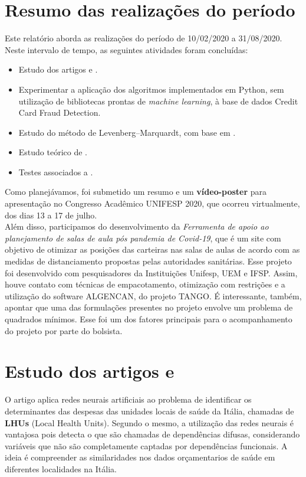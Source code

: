 \documentclass[11pt]{article}
\begin{document}
\section*{Resumo das realizações do período}
Este relatório aborda as realizações do período de 10/02/2020 a 31/08/2020. Neste intervalo de tempo, as seguintes atividades foram concluídas:

\begin{itemize}
\item Estudo dos artigos \cite{fraudeItalia1} e \cite{fraudeItalia2}.
\item Experimentar a aplicação dos algoritmos implementados em Python, sem utilização de bibliotecas prontas de \textit{machine learning}, à base de dados Credit Card Fraud Detection.

\item Estudo do método de Levenberg–Marquardt, com base em \cite{TCCKleber}.
\item Estudo teórico de \cite{bmLS}. 
\item Testes associados a \cite{bmLS}.
\end{itemize}

\noindent
Como planejávamos, foi submetido um resumo e um \textbf{vídeo-poster} para apresentação no Congresso Acadêmico UNIFESP 2020, que ocorreu virtualmente, dos dias 13 a 17 de julho.\\

\noindent
Além disso, participamos do desenvolvimento da \textit{Ferramenta de apoio ao planejamento de salas de aula pós pandemia de Covid-19}, que é um site com objetivo de otimizar as posições das carteiras nas salas de aulas de acordo com as medidas de distanciamento propostas pelas autoridades sanitárias. Esse projeto foi desenvolvido com pesquisadores da Instituições Unifesp, UEM e IFSP. Assim, houve contato com técnicas de empacotamento, otimização com restrições e a utilização do software ALGENCAN, do projeto TANGO\cite{TANGO}. É interessante, também, apontar que uma das formulações presentes no projeto envolve um problema de quadrados mínimos. Esse foi um dos fatores principais para o acompanhamento do projeto por parte do bolsista.
\newpage
\section{Estudo dos artigos \cite{fraudeItalia1} e \cite{fraudeItalia2}}
O artigo \cite{fraudeItalia1} aplica redes neurais artificiais ao problema de identificar os determinantes das despesas das unidades locais de saúde da Itália, chamadas de \textbf{LHUs} (Local Health Units). Segundo o mesmo, a utilização das redes neurais é vantajosa pois detecta o que são chamadas de dependências difusas, considerando variáveis que não são completamente captadas por dependências funcionais. A ideia é compreender as similaridades nos dados orçamentarios de saúde em diferentes localidades na Itália.\\
\end{document}
